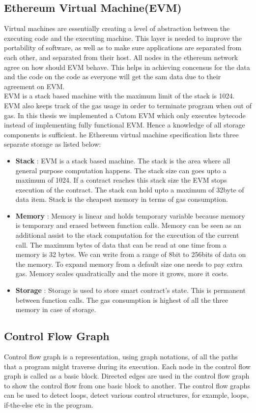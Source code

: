 \documentclass{article}
\begin{document}
\subsection*{Ethereum Virtual Machine(EVM)}
Virtual machines are essentially creating a level of abstraction between the executing code and the executing machine. This layer is needed to improve the portability of software, as well as to make sure applications are separated from each other, and separated from their host. All nodes in the ethereum network agree on how should EVM behave. This helps in achieving concensus for the data and the code on the code as everyone will get the sam data due to their agreement on EVM.\\
EVM is a stack based machine with the maximum limit of the stack is 1024. EVM also keeps track of the gas usage in order to terminate program when out of gas. In this thesis we implemented a Cutom EVM which only executes bytecode instead of implementing fully functional EVM. Hence a knowledge of all storage components is sufficient. he Ethereum virtual machine specification lists three separate storage as listed below:
\begin{itemize}
    \item \textbf{Stack} : EVM is a stack based machine. The stack is the area where all general purpose computation happens. The stack size can goes upto a maximum of 1024. If a contract reaches this stack size the EVM stops execution of the contract. The stack can hold upto a maximum of 32byte of data item. Stack is the cheapest memory in terms of gas consumption.
    \item \textbf{Memory} : Memory is linear and holds temporary variable because memory is temporary and erased between function calls. Memory can be seen as an additional assist to the stack computation for the execution of the current call. The maximum bytes of data that can be read at one time from a memory is 32 bytes. We can write from a range of 8bit to 256bits of data on the memory. To expand memory from a default size one needs to pay extra gas. Memory scales quadratically and the more it grows, more it costs. 
    \item \textbf{Storage} : Storage is used to store smart contract's state. This is permanent between function calls. The gas consumption is highest of all the three memory in case of storage.
\end{itemize}
\subsection*{Control Flow Graph}
Control flow graph is a representation, using graph notations, of all the paths that a program might traverse during its execution. Each node in the control flow graph is called as a basic block. Directed edges are used in the control flow graph to show the control flow from one basic block to another. The control flow graphs can be used to detect loops, detect various control structures, for example, loops, if-the-else etc in the program. 
\end{document}
